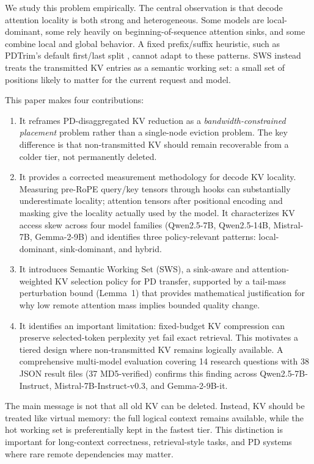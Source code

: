 \documentclass[11pt]{article}
\newcommand{\method}{SWS}
\newcommand{\fullmethod}{Semantic Working Set}
\theoremstyle{definition}
\theoremstyle{plain}
\begin{document}
We study this problem empirically.  The central observation is that decode attention locality is both strong and heterogeneous.  Some models are local-dominant, some rely heavily on beginning-of-sequence attention sinks, and some combine local and global behavior.  A fixed prefix/suffix heuristic, such as PDTrim's default first/last split \citep{pdtrim}, cannot adapt to these patterns.  \method{} instead treats the transmitted KV entries as a semantic working set: a small set of positions likely to matter for the current request and model.

This paper makes four contributions:
\begin{enumerate}[leftmargin=1.5em,itemsep=2pt]
  \item It reframes PD-disaggregated KV reduction as a \emph{bandwidth-constrained placement} problem rather than a single-node eviction problem.  The key difference is that non-transmitted KV should remain recoverable from a colder tier, not permanently deleted.
  \item It provides a corrected measurement methodology for decode KV locality.  Measuring pre-RoPE query/key tensors through hooks can substantially underestimate locality; attention tensors after positional encoding and masking give the locality actually used by the model.  It characterizes KV access skew across four model families (Qwen2.5-7B, Qwen2.5-14B, Mistral-7B, Gemma-2-9B) and identifies three policy-relevant patterns: local-dominant, sink-dominant, and hybrid.
  \item It introduces \fullmethod{} (\method{}), a sink-aware and attention-weighted KV selection policy for PD transfer, supported by a tail-mass perturbation bound (Lemma~1) that provides mathematical justification for why low remote attention mass implies bounded quality change.
  \item It identifies an important limitation: fixed-budget KV compression can preserve selected-token perplexity yet fail exact retrieval.  This motivates a tiered design where non-transmitted KV remains logically available.  A comprehensive multi-model evaluation covering 14 research questions with 38 JSON result files (37 MD5-verified) confirms this finding across Qwen2.5-7B-Instruct, Mistral-7B-Instruct-v0.3, and Gemma-2-9B-it.
\end{enumerate}

The main message is not that all old KV can be deleted.  Instead, KV should be treated like virtual memory: the full logical context remains available, while the hot working set is preferentially kept in the fastest tier.  This distinction is important for long-context correctness, retrieval-style tasks, and PD systems where rare remote dependencies may matter.
\end{document}

